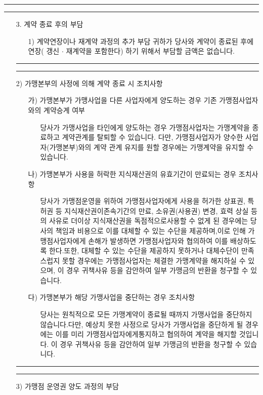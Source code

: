 \documentclass[a5paper,10pt]{oblivoir}
\newcommand\crule[3][black]{\textcolor{#1}{\rule{#2}{#3}}}
\begin{document}
\newpage
\begin{center}
\crule[red]{4cm}{0.1cm} \crule[blue]{4cm}{0.1cm}
\end{center}
\begin{enumerate}
\item[3.] 계약 종료 후의 부담
\begin{enumerate}
\item[1)] 계약연장이나 재계약 과정의 추가 부담
 귀하가 당사와 계약이 종료된 후에 연장( 갱신 $\cdot$ 재계약을 포함한다) 하기 위해서 부담할 금액은 없습니다.
\end{enumerate}
\newpage
\begin{center}
\crule[red]{4cm}{0.1cm} \crule[blue]{4cm}{0.1cm}
\end{center}
\item[2)] 가맹본부의 사정에 의해 계약 종료 시 조치사항
\begin{enumerate}
\item[가)]
가맹본부가 가맹사업을 다른 사업자에게 양도하는 경우 기존 가맹점사업자와의 계약승계 여부
\begin{itemize}
\item[]
당사가 가맹사업을 타인에게 양도하는 경우 가맹점사업자는 가맹계약을 종료하고 계약관계를 탈퇴할 수 있습니다. 다만, 가맹점사업자가 양수한 사업자(가맹본부)와의 계약 관계 유지를 원할 경우에는 가맹계약을 유지할 수 있습니다.
\end{itemize}
\item[나)]
가맹본부가 사용을 허락한 지식재산권의 유효기간이 만료되는 경우 조치사항
\begin{itemize}
\item[]
당사가 가맹점운영을 위하여 가맹점사업자에게 사용을 허가한 상표권, 특허권 등 지식재산권이존속기간의 만료, 소유권(사용권) 변경, 효력 상실 등의 사유로 더이상 지식재산권을 독점적으로사용할 수 없게 된 경우에는 당사의 책임과 비용으로 이를 대체할 수 있는 수단을 제공하며,이로 인해 가맹점사업자에게 손해가 발생하면 가맹점사업자와 협의하여 이를 배상하도록 한다.또한, 대체할 수 있는 수단을 제공하지 못하거나 대체수단이 만족스럽지 못할 경우에는 가맹점사업자는 체결한 가맹계약을 해지하실 수 있으며, 이 경우 귀책사유 등을 감안하여 일부 가맹금의 반환을 청구할 수 있습니다.
\end{itemize}
\item[다)]
가맹본부가 해당 가맹사업을 중단하는 경우 조치사항
\begin{itemize}
\item[]
당사는 원칙적으로 모든 가맹계약이 종료될 때까지 가맹사업을 중단하지 않습니다.다만, 예상치 못한 사정으로 당사가 가맹사업을 중단하게 될 경우에는 이를 미리 가맹점사업자에게통지하고 협의하여 계약을 해지할 것입니다. 이 경우 귀책사유 등을 감안하여 일부 가맹금의 반환을 청구할 수 있습니다.
\end{itemize}
\end{enumerate}
\newpage
\begin{center}
\crule[red]{4cm}{0.1cm} \crule[blue]{4cm}{0.1cm}
\end{center}
\item[3)] 가맹점 운영권 양도 과정의 부담


\end{enumerate}
\end{document}
